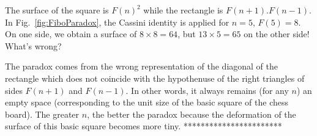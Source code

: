 {The surface of the square is $F(n)^2$ while the rectangle is $F(n+1).F(n-1)$.
In Fig.~\ref{fig:FiboParadox}, the Cassini identity is applied for $n=5$, $F(5)=8$. 
On one side, we obtain a surface of $8 \times 8 = 64$, but $13 \times 5 = 65$ on the other side!
What's wrong?

The paradox comes from the wrong representation of the diagonal of the rectangle which does not coincide with the hypothenuse
of the right triangles of sides $F(n+1)$ and $F(n-1)$.
In other words, it always remains (for any $n$) an empty space (corresponding to the unit size of the basic square of the chess board).
The greater $n$, the better the paradox because the deformation of the surface of this basic square becomes more tiny. 
***********************}


%
%
%
%
%
%
